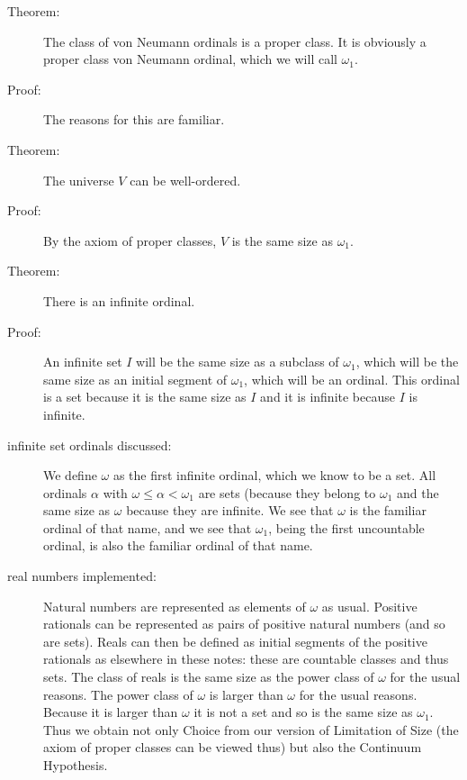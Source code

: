 \documentclass[12pt]{book}
\begin{document}
\begin{description}
\item[Theorem:]  The class of von Neumann ordinals is a proper class.  It is obviously a proper class von Neumann ordinal, which we will call $\omega_1$.

\item[Proof:]  The reasons for this are familiar.

\item[Theorem:]  The universe $V$ can be well-ordered.

\item[Proof:]  By the axiom of proper classes, $V$ is the same size as $\omega_1$.

\item[Theorem:]  There is an infinite ordinal.

\item[Proof:]  An infinite set $I$ will be the same size as a subclass of $\omega_1$, which will be the same size as an initial segment of $\omega_1$, which will be an ordinal.  This ordinal is a set because it is the same size as $I$ and it is infinite because $I$ is infinite.  

\item[infinite set ordinals discussed:]  We define $\omega$ as the first infinite ordinal, which we know to be a set.  All ordinals $\alpha$ with
$\omega \leq \alpha <\omega_1$ are sets (because they belong to $\omega_1$ and the same size as $\omega$ because they are infinite.  We see that $\omega$ is the familiar ordinal of that name, and we see that $\omega_1$, being the first uncountable ordinal, is also the familiar ordinal of that name.

\item[real numbers implemented:]  Natural numbers are represented as elements of $\omega$ as usual.  Positive rationals can be represented as pairs of positive natural numbers (and so are sets).  Reals can then be defined as initial segments of the positive rationals as elsewhere in these notes:  these are countable classes and thus sets.
The class of reals is the same size as the power class of $\omega$ for the usual reasons.  The power class of $\omega$  is larger than $\omega$ for the usual reasons.  Because it is larger than $\omega$ it is not a set and so is the same size as $\omega_1$.  Thus we obtain not only Choice from our version of Limitation of Size (the axiom of proper classes can be viewed thus) but also the Continuum Hypothesis.

\end{description}
\end{document}

